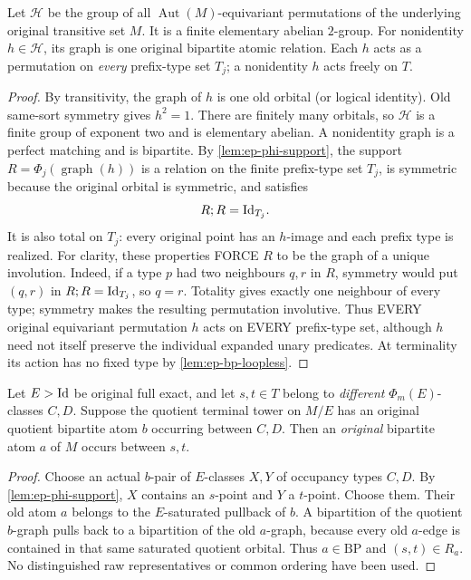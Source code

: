 \begin{lemma}
\label{lem:ep-original-functional}
Let \(\mathscr H\) be the group of all
\(\operatorname{Aut}(M)\)-equivariant permutations
of the underlying original transitive set \(M\).
It is a finite elementary abelian \(2\)-group.
For nonidentity \(h\in\mathscr H\), its graph is
one original bipartite atomic relation. Each
\(h\) acts as a permutation on \emph{every}
prefix-type set \(T_j\); a nonidentity \(h\)
acts freely on \(T\).
\end{lemma}
\begin{proof}
By transitivity, the graph of \(h\) is one
old orbital (or logical identity). Old same-sort
symmetry gives \(h^2=1\). There are finitely
many orbitals, so \(\mathscr H\) is a finite group
of exponent two and is elementary abelian.
A nonidentity graph is a perfect matching
and is bipartite. By
\cref{lem:ep-phi-support}, the support
\(R=\Phi_j(\operatorname{graph}(h))\)
is a relation on the finite prefix-type
set \(T_j\), is symmetric because the
original orbital is symmetric, and satisfies
\[
                    R;R=\mathrm{Id}_{T_j}.
\]
It is also total on \(T_j\): every
original point has an \(h\)-image and
each prefix type is realized.
For clarity, these properties FORCE
\(R\) to be the graph of a unique
involution. Indeed, if a type \(p\)
had two neighbours \(q,r\) in \(R\),
symmetry would put \((q,r)\) in
\(R;R=\mathrm{Id}_{T_j}\), so \(q=r\).
Totality gives exactly one neighbour
of every type; symmetry makes the
resulting permutation involutive.
Thus EVERY original equivariant
permutation \(h\) acts on EVERY
prefix-type set, although \(h\) need
not itself preserve the individual
expanded unary predicates.
At terminality its action has no fixed
type by \cref{lem:ep-bp-loopless}.
\end{proof}

\begin{lemma}
\label{lem:ep-lift-separator}
Let \(E>\mathrm{Id}\) be original full exact, and let
\(s,t\in T\) belong to \emph{different}
\(\Phi_m(E)\)-classes \(C,D\). Suppose the
quotient terminal tower on \(M/E\) has an
original quotient bipartite atom \(b\)
occurring between \(C,D\). Then an
\emph{original} bipartite atom \(a\) of \(M\)
occurs between \(s,t\).
\end{lemma}
\begin{proof}
Choose an actual \(b\)-pair of \(E\)-classes \(X,Y\)
of occupancy types \(C,D\). By
\cref{lem:ep-phi-support}, \(X\) contains an
\(s\)-point and \(Y\) a \(t\)-point. Choose them.
Their old atom \(a\) belongs to the
\(E\)-saturated pullback of \(b\).
A bipartition of the quotient \(b\)-graph
pulls back to a bipartition of the old
\(a\)-graph, because every old \(a\)-edge is
contained in that same saturated quotient
orbital. Thus \(a\in\mathrm{BP}\) and
\((s,t)\in R_a\). No distinguished raw
representatives or common ordering have been
used.
\end{proof}

